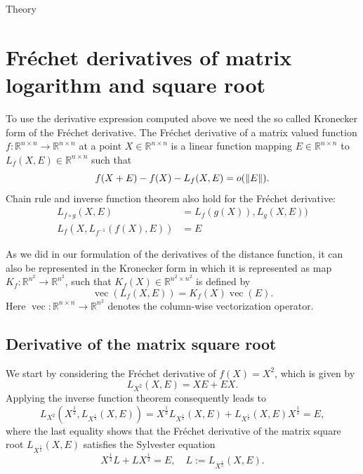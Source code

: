 \begin{chapter}{Theory}
\section{Fr\'{e}chet derivatives of matrix logarithm and square root} %
\label{sec:frechetderivatives}
To use the derivative expression computed above we need the so called Kronecker form of the Fr\'{e}chet derivative. The Fr\'{e}chet derivative
of a matrix valued function $f:\mathbb{R}^{n\times n}\to\mathbb{R}^{n\times n}$ at a point $X\in\mathbb{R}^{n\times n}$ is a linear function mapping $E\in\mathbb{R}^{n\times n}$
to $L_f(X,E)\in \mathbb{R}^{n\times n}$ such that
\begin{equation}
    f(X+E) - f(X) - L_f(X,E) = o(\| E \|).
\end{equation}
Chain rule and inverse function theorem also hold for the Fr\'{e}chet derivative:
\begin{align}
    L_{f\circ g}(X, E) &= L_{f}(g(X)),L_{g}(X,E))\\
    L_{f}(X, L_{f^{-1}}(f(X),E)) &= E
\end{align}

As we did in our formulation of the derivatives of the distance function, it can also be represented in the Kronecker form in which it is represented as map
$K_f:\mathbb{R}^{n^2}\to\mathbb{R}^{n^2}$, such that $K_f(X)\in \mathbb{R}^{n^2\times n^2}$ is defined by
\begin{equation}
    \label{eq:kronckerform}
    \operatorname{vec}(L_f(X,E))=K_f(X)\operatorname{vec}(E).
\end{equation}
Here $\operatorname{vec}:\mathbb{R}^{n\times n}\to\mathbb{R}^{n^2}$ denotes the column-wise vectorization operator.

\subsection{Derivative of the matrix square root} %
\label{sub:Derivative of the matrix square root}
We start by considering the Fr\'{e}chet derivative of $f(X)=X^2$, which is given by
\begin{equation}
    L_{X^2}(X,E) = XE + EX.
\end{equation}
Applying the inverse function theorem consequently leads to
\begin{equation}
    L_{X^2}(X^{\frac{1}{2}},L_{X^{\frac{1}{2}}}(X,E))=X^{\frac{1}{2}}L_{X^{\frac{1}{2}}}(X,E) + L_{X^{\frac{1}{2}}}(X,E)X^{\frac{1}{2}} = E,
\end{equation}
where the last equality shows that the Fr\'{e}chet derivative of the matrix square root $L_{X^{\frac{1}{2}}}(X,E)$ satisfies the Sylvester equation 
\begin{equation}
    \label{eq:sylvester}
    X^{\frac{1}{2}}L + LX^{\frac{1}{2}} = E,\quad L:=L_{X^{\frac{1}{2}}}(X,E).
\end{equation}


\end{chapter}

